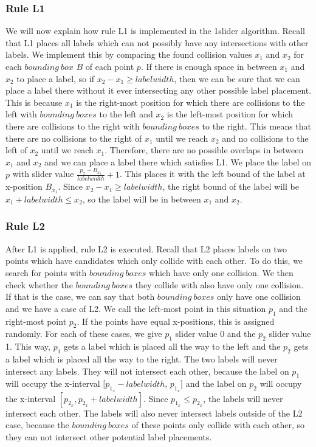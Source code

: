 \documentclass[crop=false,a4paper,oneside,11pt]{article}
\begin{document}
\subsubsection{Rule L1}
We will now explain how rule L1 is implemented in the 1slider algorithm. Recall that L1 places all labels which can not possibly have any intersections with other labels. We implement this by comparing the found collision values $x_1$ and $x_2$ for each $bounding \ box$ $B$ of each point $p$. If there is enough space in between $x_1$ and $x_2$ to place a label, so if $x_2 - x_1 \geq labelwidth$, then we can be sure that we can place a label there without it ever intersecting any other possible label placement. This is because $x_1$ is the right-most position for which there are collisions to the left with $bounding \ boxes$ to the left and $x_2$ is the left-most position for which there are collisions to the right with $bounding \ boxes$ to the right. This means that there are no collisions to the right of $x_1$ until we reach $x_2$ and no collisions to the left of $x_2$ until we reach $x_1$. Therefore, there are no possible overlaps in between $x_1$ and $x_2$ and we can place a label there which satisfies L1. We place the label on $p$ with slider value $\frac{p_x - B_{x_1}}{labelwidth} + 1$. This places it with the left bound of the label at x-position $B_{x_1}$. Since $x_2 - x_1 \geq labelwidth$, the right bound of the label will be $x_1 + labelwidth \leq x_2$, so the label will be in between $x_1$ and $x_2$.
\subsubsection{Rule L2}
After L1 is applied, rule L2 is executed. Recall that L2 places labels on two points which have candidates which only collide with each other. To do this, we search for points with $bounding \ boxes$ which have only one collision. We then check whether the $bounding \ boxes$ they collide with also have only one collision. If that is the case, we can say that both $bounding \ boxes$ only have one collision and we have a case of L2. We call the left-most point in this situation $p_1$ and the right-most point $p_2$. If the points have equal x-positions, this is assigned randomly. For each of these cases, we give $p_1$ slider value 0 and the $p_2$ slider value 1. This way, $p_1$ gets a label which is placed all the way to the left and the $p_2$ gets a label which is placed all the way to the right. The two labels will never intersect any labels. They will not intersect each other, because the label on $p_1$ will occupy the x-interval $[p_{1_x} - labelwidth$, $p_{1_x}]$ and the label on $p_2$ will occupy the x-interval $[p_{2_x}, p_{2_x} + labelwidth]$. Since $p_{1_x} \leq p_{2_x}$, the labels will never intersect each other. The labels will also never intersect labels outside of the L2 case, because the $bounding \ boxes$ of these points only collide with each other, so they can not intersect other potential label placements.
\end{document}
